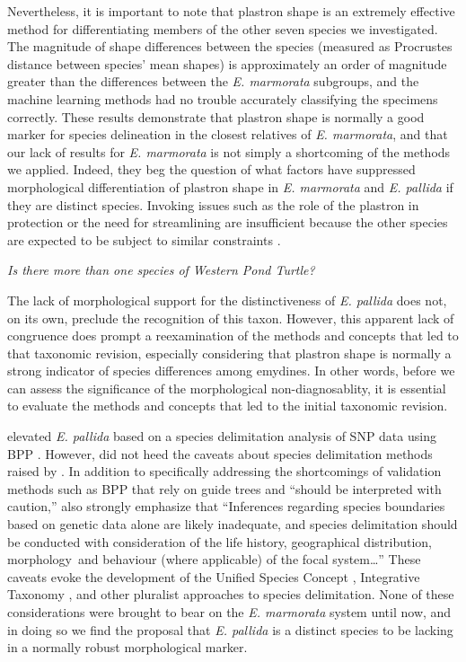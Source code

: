 \documentclass[12pt,letterpaper]{article}
\renewcommand{\subsection}[1]{%
\bigskip
\begin{center}
\begin{large}
\normalfont\itshape #1
\end{large}
\end{center}}
\begin{document}
Nevertheless, it is important to note that plastron shape is an extremely effective method for differentiating members of the other seven species we investigated. The magnitude of shape differences between the species (measured as Procrustes distance between species' mean shapes) is approximately an order of magnitude greater than the differences between the \textit{E. marmorata} subgroups, and the machine learning methods had no trouble accurately classifying the specimens correctly. These results demonstrate that plastron shape is normally a good marker for species delineation in the closest relatives of \textit{E. marmorata}, and that our lack of results for \textit{E. marmorata} is not simply a shortcoming of the methods we applied. Indeed, they beg the question of what factors have suppressed morphological differentiation of plastron shape in \textit{E. marmorata} and \textit{E. pallida} if they are distinct species. Invoking issues such as the role of the plastron in protection or the need for streamlining are insufficient because the other species are expected to be subject to similar constraints \citep{Stayton2011,Pollyb}. 

\subsection{Is there more than one species of Western Pond Turtle?}

The lack of morphological support for the distinctiveness of \textit{E. pallida} does not, on its own, preclude the recognition of this taxon. However, this apparent lack of congruence does prompt a reexamination of the methods and concepts that led to that taxonomic revision, especially considering that plastron shape is normally a strong indicator of species differences among emydines. In other words, before we can assess the significance of the morphological non-diagnosablity, it is essential to evaluate the methods and concepts that led to the initial taxonomic revision. 

\citet{Spinks2014} elevated \textit{E. pallida} based on a species delimitation analysis of SNP data using BPP \citep{Yang2010b}. However, \citet{Spinks2014} did not heed the caveats about species delimitation methods raised by \citet{Carstens2013}. In addition to specifically addressing the shortcomings of validation methods such as BPP that rely on guide trees and ``should be interpreted with caution,'' \citet{Carstens2013} also strongly emphasize that ``Inferences regarding species boundaries based on genetic data alone are likely inadequate, and species delimitation should be conducted with consideration of the life history, geographical distribution, morphology and behaviour (where applicable) of the focal system\dots'' These caveats evoke the development of the Unified Species Concept \citep{Dayrat2005a,DeQueiroz2007b}, Integrative Taxonomy \citep{Padial2010}, and other pluralist approaches to species delimitation. None of these considerations were brought to bear on the \textit{E. marmorata} system until now, and in doing so we find the proposal that \textit{E. pallida} is a distinct species to be lacking in a normally robust morphological marker.
\end{document}
